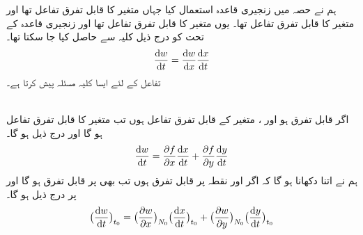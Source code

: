 ہم نے حصہ  میں زنجیری قاعدہ استعمال کیا جہاں   متغیر  کا قابل تفرق تفاعل تھا  اور   متغیر  کا قابل تفرق تفاعل تھا۔ یوں  متغیر  کا قابل تفرق تفاعل تھا اور زنجیری قاعدہ کے تحت  کو درج ذیل کلیہ سے حاصل کیا جا سکتا تھا۔
\begin{align*}
\frac{\dif w}{\dif t}=\frac{\dif w}{\dif x}\frac{\dif x}{\dif t}
\end{align*}
تفاعل  کے لئے   ایسا کلیہ مسئلہ  پیش کرتا ہے۔

\\
اگر   قابل تفرق ہو اور  ،  متغیر  کے قابل تفرق تفاعل ہوں تب  متغیر  کا قابل تفرق تفاعل ہو گا اور  درج ذیل ہو گا۔
\begin{align}\label{مساوات_کثیرالمتغیر_زنجیری_دو_متغیرات_الف}
\frac{\dif w}{\dif t}=\frac{\partial f}{\partial x}\frac{\dif x}{\dif t}+\frac{\partial f}{\partial y}\frac{\dif y}{\dif t}
\end{align}
ہم نے اتنا دکھانا ہو گا کہ اگر   اور  نقطہ  پر قابل تفرق ہوں تب  بھی  پر قابل تفرق ہو گا اور  پر درج ذیل ہو گا۔
\begin{align}\label{مساوات_کثیرالمتغیر_زنجیری_دو_متغیرات_ب}
\big(\frac{\dif w}{\dif t}\big)_{t_0}=\big(\frac{\partial w}{\partial x}\big)_{N_0}\big(\frac{\dif x}{\dif t}\big)_{t_0}+\big(\frac{\partial w}{\partial y}\big)_{N_0}\big(\frac{\dif y}{\dif t}\big)_{t_0}
\end{align}

